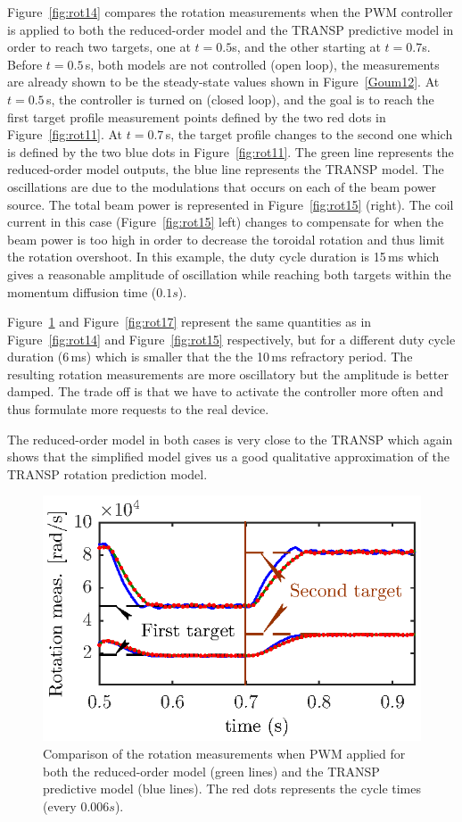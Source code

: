 \documentclass{iopart}
\begin{document}
Figure~\ref{fig:rot14} compares the rotation measurements when the PWM controller is applied to both the reduced-order model and the TRANSP predictive model in order to reach two targets, one at $t = 0.5$s, and the other starting at $t=0.7$s.
Before $t=0.5$\,s, both models are not controlled (open loop), the measurements are already shown to be the steady-state values shown in Figure~\ref{Goum12}.
At $t = 0.5$\,s, the controller is turned on (closed loop), and the goal is to reach the first target profile measurement points defined by the two red dots in Figure~\ref{fig:rot11}. At $t = 0.7$\,s, the  target profile changes to the second one which is defined by the two blue dots in Figure~\ref{fig:rot11}.
The green line represents the reduced-order model outputs, the blue line represents the TRANSP model. The oscillations are due to the modulations that occurs on each of the beam power source. The total beam power is represented in Figure~\ref{fig:rot15} (right). The coil current in this case (Figure~\ref{fig:rot15} left) changes to compensate for when the beam power is too high in order to decrease the toroidal rotation and thus limit the rotation overshoot.
In this example, the duty cycle duration is 15\,ms which gives a reasonable amplitude of oscillation while reaching both targets within the momentum diffusion time ($0.1 s$).

Figure~\ref{fig:rot16} and Figure~\ref{fig:rot17} represent the same quantities as in Figure~\ref{fig:rot14} and Figure~\ref{fig:rot15} respectively, but for a different duty cycle duration (6\,ms) which is smaller that the the 10\,ms refractory period.
The resulting rotation measurements are more oscillatory but the amplitude is better damped. The trade off is that we have to activate the controller more often and thus formulate more requests to the real device.

The reduced-order model in both cases is very close to the TRANSP which again shows that the simplified model gives us a good qualitative approximation of the TRANSP rotation prediction model.

\begin{figure}
	\centering
	\includegraphics{fig17} %
	\caption{Comparison of the rotation measurements when PWM applied for both the reduced-order model (green lines) and the TRANSP predictive model (blue lines). The red dots represents the cycle times (every $0.006 s$).}
	\label{fig:rot16}
\end{figure}
\end{document}
